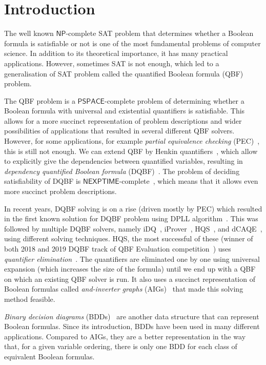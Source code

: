 \documentclass[
  digital, %
  color,
  twoside, %
  table,   %
  nolof,     %
  nolot,     %
]{fithesis3}
\theoremstyle{definition}
\theoremstyle{remark}
\newcommand{\ComplexityFont}[1]{\mathsf{#1}}
\newcommand{\PSPACE}{\ComplexityFont{PSPACE}}
\newcommand{\NP}{\ComplexityFont{NP}}
\newcommand{\NEXPTIME}{\ComplexityFont{NEXPTIME}}
\begin{document}
\chapter{Introduction}
The well known $\NP$-complete SAT problem that determines whether a Boolean formula is satisfiable or not is one of the most fundamental problems of computer science. In addition to its theoretical importance, it has many practical applications. However, sometimes SAT is not enough, which led to a generalisation of SAT problem called the quantified Boolean formula (QBF) problem. %

The QBF problem is a $\PSPACE$-complete problem of determining whether a Boolean formula with universal and existential quantifiers is satisfiable. This allows for a more succinct representation of problem descriptions and wider possibilities of applications that resulted in several different QBF solvers. However, for some applications, for example \emph{partial equivalence checking} (PEC)~\cite{HQSsimpleAlg}, this is still not enough. We can extend QBF by Henkin quantifiers~\cite{HenkinQuant}, which allow to explicitly give the dependencies between quantified variables, resulting in \emph{dependency quantified Boolean formula} (DQBF)~\cite{NegationOfDQBFs}. The problem of deciding satisfiability of DQBF is $\NEXPTIME$-complete~\cite{DQBFisNEXPTIME}, which means that it allows even more succinct problem descriptions.

In recent years, DQBF solving is on a rise (driven mostly by PEC) which resulted in the first known solution for DQBF problem using DPLL algorithm~\cite{DPLLalgorithm}. This was followed by multiple DQBF solvers, namely iDQ~\cite{iDQandDQDIMACS}, iProver~\cite{iProver}, HQS~\cite{HQSquantifierElimination,HQSdependencyElimination,HQSquantifierLocalisation}, and dCAQE~\cite{dCAQE}, using different solving techniques. HQS, the most successful of these (winner of both 2018 and 2019 DQBF track of QBF Evaluation competition~\cite{QBFeval18,QBFeval19}) uses \emph{quantifier elimination}~\cite{HQSquantifierElimination}. The quantifiers are eliminated one by one using universal expansion (which increases the size of the formula) until we end up with a QBF on which an existing QBF solver is run. It also uses a succinct representation of Boolean formulas called \emph{and-inverter graphs} (AIGs)~\cite{FRAIGs} that made this solving method feasible.

\emph{Binary decision diagrams} (BDDs)~\cite{BDD} are another data structure that can represent Boolean formulas. Since its introduction, BDDs have been used in many different applications. Compared to AIGs, they are a better representation in the way that, for a given variable ordering, there is only one BDD for each class of equivalent Boolean formulas.
\end{document}
